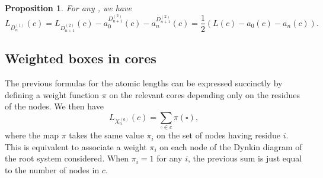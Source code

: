 \documentclass[pdftex]{sigma}
\newtheorem{Proposition}[Theorem]{Proposition}
 { \theoremstyle{definition}
\newtheorem{Definition}[Theorem]{Definition}
\newtheorem{Note}[Theorem]{Note}
\newtheorem{Example}[Theorem]{Example}
\newtheorem{Remark}[Theorem]{Remark} }
\numberwithin{equation}{section}
\begin{document}
\begin{Proposition}
	\label{Prop_D(n,1)} For any , we have
	\begin{equation*}
	L_{D_{n}^{(1)}}(c)=L_{D_{n+1}^{(2)}}(c)-a_{0}^{D_{n+1}^{(2)}}(c)-a_{n}^{D_{n+1}^{(2)}}(c)=
	\frac{1}{2}(L(c)-a_{0}(c)-a_{n}(c)).
	\end{equation*}
\end{Proposition}

\subsection{Weighted boxes in cores}\label{subsec:weighted}

The previous formulas for the atomic lengths can be expressed succinctly by
defining a weight function $\pi $ on the relevant cores depending only on
the residues of the nodes. We then have
\begin{equation*}
L_{X_{n}^{(a)}}(c)=\sum_{\square \in c}\pi (\square ),
\end{equation*}%
where the map $\pi $ takes the same value $\pi _{i}$ on the set of nodes
having residue $i$. This is equivalent to associate a weight $\pi _{i}$ on
each node of the Dynkin diagram of the root system considered. When $\pi
_{i}=1$ for any $i$, the previous sum is just equal to the number of nodes
in $c$.
\end{document}

